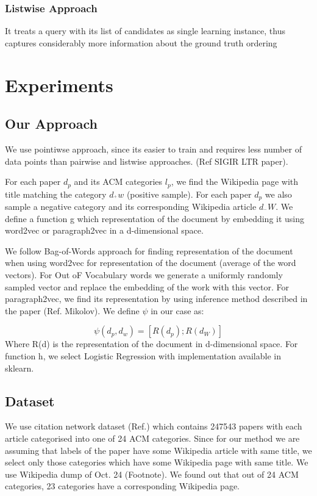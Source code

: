 \documentclass[runningheads,a4paper]{llncs}
\begin{document}
\subsubsection{Listwise Approach}
It treats a query with its list of candidates as single learning instance, thus captures considerably more information about the ground truth ordering

\section{Experiments}
\subsection{Our Approach}
We use pointiwse approach, since its easier to train and requires less number of data points than pairwise and listwise approaches. (Ref SIGIR LTR paper).

For each paper $d_p$ and its ACM categories $l_p$, we find the Wikipedia page with title matching the category $d_^+w$ (positive sample). For each paper $d_p$ we also sample a negative category and its corresponding Wikipedia article $d_^-W$. We define a function g which representation of the document by embedding it using word2vec or paragraph2vec in a d-dimensional space.

We follow Bag-of-Words approach for finding representation of the document when using word2vec for representation of the document (average of the word vectors). For Out oF Vocabulary words we generate a uniformly randomly sampled vector and replace the embedding of the work with this vector. For paragraph2vec, we find its representation by using inference method described in the paper (Ref. Mikolov). We define $\psi$ in our case as:

$$ \psi (d_p, d_w) = [R(d_p) ; R(d_W)] $$
Where R(d) is the representation of the document in d-dimensional space. For function h, we select Logistic Regression with implementation available in sklearn.

\subsection{Dataset}
We use citation network dataset (Ref.) which contains 247543 papers with each article categorised into one of 24 ACM categories. Since for our method we are assuming that labels of the paper have some Wikipedia article with same title, we select only those categories which have some Wikipedia page with same title. We use Wikipedia dump of Oct. 24 (Footnote). We found out that out of 24 ACM categories, 23 categories have a corresponding Wikipedia page. 
\end{document}
